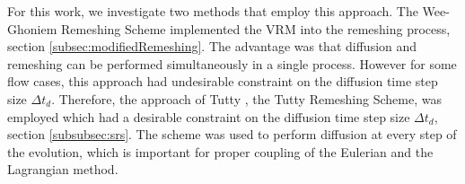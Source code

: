 For this work, we investigate two methods that employ this approach. The Wee-Ghoniem Remeshing Scheme \cite{Wee2006a} implemented the VRM into the remeshing process, section \ref{subsec:modifiedRemeshing}. The advantage was that diffusion and remeshing can be performed simultaneously in a single process. However for some flow cases, this approach had undesirable constraint on the diffusion time step size $\Delta t_d$. Therefore, the approach of Tutty \cite{Tutty2010a}, the Tutty Remeshing Scheme, was employed which had a desirable constraint on the diffusion time step size $\Delta t_d$, section \ref{subsubsec:srs}. The scheme was used to perform diffusion at every step of the evolution, which is important for proper coupling of the Eulerian and the Lagrangian method.





